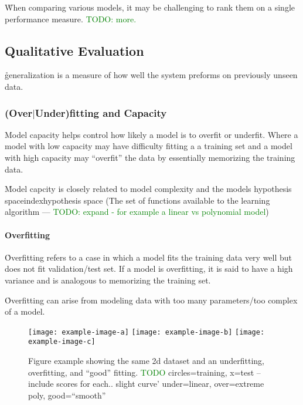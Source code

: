\r{When comparing various models, it may be challenging to rank them on a single performance measure. \textcolor{green}{TODO: more.}}

\subsection{Qualitative Evaluation}

\r{generalization is a measure of how well the system preforms on previously unseen data.}

\subsubsection{(Over$|$Under)fitting and Capacity}

\r{{Model capacity} helps control how likely a model is to overfit or underfit. Where a model with low capacity may have difficulty fitting a a training set and a model with high capacity may ``overfit'' the data by essentially memorizing the training data.}

\r{Model capcity is closely related to model complexity and the models {hypothesis space}index{hypothesis space} (The set of functions available to the learning algorithm --- \textcolor{green}{TODO: expand - for example a linear vs polynomial model})}


\paragraph{Overfitting}

\r{Overfitting refers to a case in which a model fits the training data very well but does not fit validation/test set. If a model is overfitting, it is said to have a high variance and is analogous to memorizing the training set.}

\r{Overfitting can arise from modeling data with too many parameters/too complex of a model.}



\begin{figure}[htp]
	\centering
	\texttt{[image: example-image-a]}\hfil
	\texttt{[image: example-image-b]}\hfil
	\texttt{[image: example-image-c]}\hfil
	\caption{Figure example showing the same 2d dataset and an underfitting, overfitting, and ``good'' fitting. \textcolor{green}{TODO} circles=training, x=test -- include scores for each.. slight curve' under=linear, over=extreme poly, good=``smooth''}
	\label{fig:basics_eval_fitting_examples}
\end{figure}

